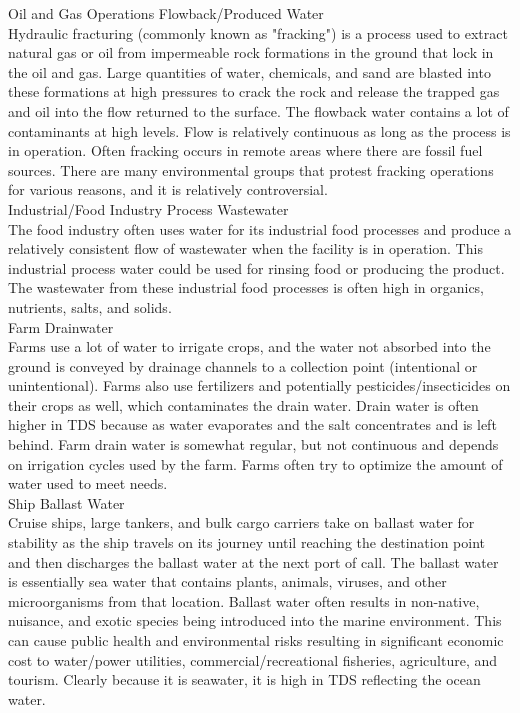 \documentclass{article}
\begin{document}
Oil and Gas Operations Flowback/Produced Water\\
Hydraulic fracturing (commonly known as "fracking") is a process used to extract natural gas or oil from impermeable rock formations in the ground that lock in the oil and gas.  Large quantities of water, chemicals, and sand are blasted into these formations at high pressures to crack the rock and release the trapped gas and oil into the flow returned to the surface.  The flowback water contains a lot of contaminants at high levels.  Flow is relatively continuous as long as the process is in operation.  Often fracking occurs in remote areas where there are fossil fuel sources.  There are many environmental groups that protest fracking operations for various reasons, and it is relatively controversial.\\
 
Industrial/Food Industry Process Wastewater\\
The food industry often uses water for its industrial food processes and produce a relatively consistent flow of wastewater when the facility is in operation.  This industrial process water could be used for rinsing food or producing the product.  The wastewater from these industrial food processes is often high in organics, nutrients, salts, and solids.\\
 
Farm Drainwater\\
Farms use a lot of water to irrigate crops, and the water not absorbed into the ground is conveyed by drainage channels to a collection point (intentional or unintentional).  Farms also use fertilizers and potentially pesticides/insecticides on their crops as well, which contaminates the drain water.  Drain water is often higher in TDS because as water evaporates and the salt concentrates and is left behind.  Farm drain water is somewhat regular, but not continuous and depends on irrigation cycles used by the farm.  Farms often try to optimize the amount of water used to meet needs.\\
      
  
Ship Ballast Water\\
Cruise ships, large tankers, and bulk cargo carriers take on ballast water for stability as the ship travels on its journey until reaching the destination point and then discharges the ballast water at the next port of call.  The ballast water is essentially sea water that contains plants, animals, viruses, and other microorganisms from that location.  Ballast water often results in non-native, nuisance, and exotic species being introduced into the marine environment.  This can cause public health and environmental risks resulting in significant economic cost to water/power utilities, commercial/recreational fisheries, agriculture, and tourism.  Clearly because it is seawater, it is high in TDS reflecting the ocean water.\\
\end{document}

